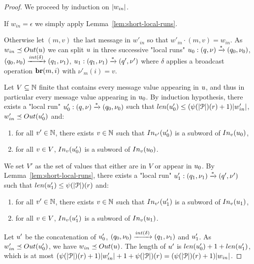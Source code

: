 \lemShortRunOutput*

\begin{proof}
	
	We proceed by induction on $|w_{in}|$.
	
	If $w_{in} = \epsilon$ we simply apply Lemma~\ref{lem:short-local-runs}.
	
	Otherwise let $(m,v)$ the last message in $w'_{in}$ so that $w'_{in} \cdot (m,v) = w_{in}$.
	As $w_{in} \subword \Output{\localrun}$ we can split $u$ in three successive "local runs" $u_0: (q, \nu) \xrightarrow{*} (q_0, \nu_0)$, $(q_0, \localdata_0) \intstep{\delta} (q_1, \localdata_1)$, $u_1 :(q_1, \nu_1) \xrightarrow{*} (q', \nu')$ where $\delta$ applies a broadcast operation $\textbf{br}(m, i)$ with $\nu'_{m} (i) = v$.
	
	Let $V \subseteq \mathbb{N}$ finite that contains every message value appearing in $u$, and thus in particular every message value appearing in $u_0$.
	By induction hypothesis, there exists a "local run" $u_0': (q, \nu) \xrightarrow{*} (q_0, \nu_0)$ such that $\length{\localrun_0'} \leq (\towerfun(\size{\prot})(r)+1)\size{w'_{in}}$, $w'_{in} \subword \Output{\localrun_0'}$ and:
	
	\begin{enumerate}
		\item for all $v' \in \mathbb{N}$, there exists $v \in \mathbb{N}$ such that $\vinput{\aval'}{\localrun_0'}$ is a subword of $\vinput{\aval}{\localrun_0}$,
		\item for all $v \in V$, $\vinput{\aval}{\localrun_0'}$ is a subword of $\vinput{\aval}{\localrun_0}$. 
	\end{enumerate}
	
	We set $V'$ as the set of values that either are in $V$ or appear in $u_0$.
	By Lemma~\ref{lem:short-local-runs}, there exists a "local run" $u_1': (q_1, \nu_1) \xrightarrow{*} (q', \nu')$ such that $\length{\localrun_1'} \leq \towerfun(\size{\prot})(r)$ and:
	\begin{enumerate}
		\item for all $v' \in \mathbb{N}$, there exists $v \in \mathbb{N}$ such that $\vinput{\aval'}{\localrun_1'}$ is a subword of $\vinput{\aval}{\localrun_1}$,
		\item for all $v \in V$, $\vinput{\aval}{\localrun_1'}$ is a subword of $\vinput{\aval}{\localrun_1}$. 
	\end{enumerate}
	
	Let $u'$ be the concatenation of $u'_0$, $(q_0, \localdata_0) \intstep{\delta} (q_1, \localdata_1)$ and $u'_1$. As $w'_{in} \subword \Output{\localrun'_0}$, we have $w_{in} \subword \Output{\localrun}$.
	The length of $u'$ is $\length{\localrun'_0} + 1 + \length{\localrun'_1}$, which is at most $(\psi(|\mathcal{P}|)(r)+1)|w'_{in}| + 1 + \psi(|\mathcal{P}|)(r) = (\psi(|\mathcal{P}|)(r)+1)|w_{in}|$.
	

\end{proof}
